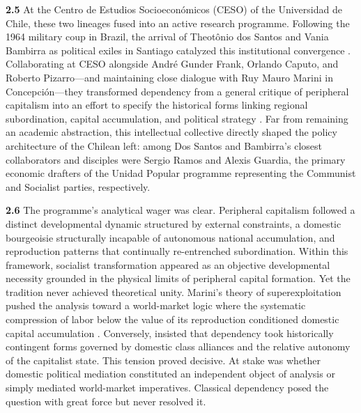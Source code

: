 \textbf{2.5} At the Centro de Estudios Socioeconómicos (CESO) of the Universidad de Chile, 
these two lineages fused into an active research programme. Following the 1964 military coup 
in Brazil, the arrival of Theotônio dos Santos and Vania Bambirra as political exiles in Santiago 
catalyzed this institutional convergence \citep{CardenasSeabra2022}. Collaborating at CESO 
alongside André Gunder Frank, Orlando Caputo, and Roberto Pizarro—and maintaining close dialogue 
with Ruy Mauro Marini in Concepción—they transformed dependency from a general critique of 
peripheral capitalism into an effort to specify the historical forms linking regional subordination, 
capital accumulation, and political strategy \citep{DosSantos1970,Bambirra1971,CaputoPizarro1970,Kay2010}. 
Far from remaining an academic abstraction, this intellectual collective directly shaped the policy 
architecture of the Chilean left: among Dos Santos and Bambirra's closest collaborators and disciples 
were Sergio Ramos and Alexis Guardia, the primary economic drafters of the Unidad Popular programme 
representing the Communist and Socialist parties, respectively.

\textbf{2.6} The programme's analytical wager was clear. Peripheral capitalism followed a distinct 
developmental dynamic structured by external constraints, a domestic bourgeoisie structurally 
incapable of autonomous national accumulation, and reproduction patterns that continually 
re-entrenched subordination. Within this framework, socialist transformation appeared as an 
objective developmental necessity grounded in the physical limits of peripheral capital formation. 
Yet the tradition never achieved theoretical unity. Marini's theory of superexploitation pushed 
the analysis toward a world-market logic where the systematic compression of labor below the value 
of its reproduction conditioned domestic capital accumulation \citep{Marini1973}. Conversely, 
\citet{CardosoFaletto1979} insisted that dependency took historically contingent forms governed 
by domestic class alliances and the relative autonomy of the capitalist state. This tension proved 
decisive. At stake was whether domestic political mediation constituted an independent object 
of analysis or simply mediated world-market imperatives. Classical dependency posed the question 
with great force but never resolved it.


